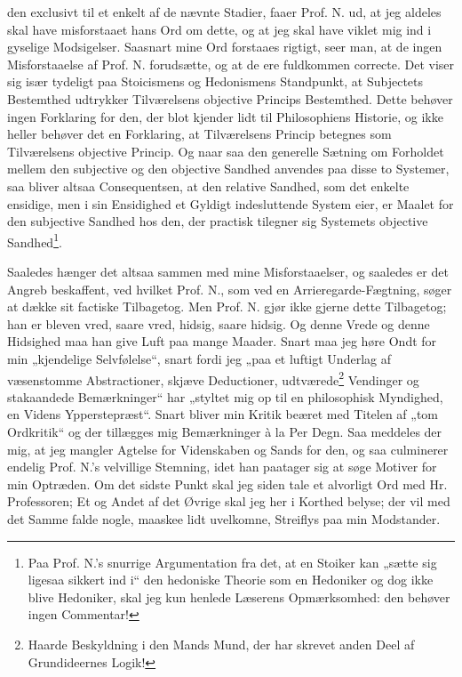 \documentclass[12pt,a4paper]{book}
\newcommand{\opage}[1]{\marginnote{\footnotesize\textit{[#1]}}}
\begin{document}
den exclusivt til et enkelt af de nævnte Stadier, faaer Prof. N. ud, at jeg
aldeles skal have misforstaaet hans Ord om dette, og at jeg skal have viklet mig
ind i gyselige Modsigelser. Saasnart mine Ord forstaaes rigtigt, seer man, at de
ingen Misforstaaelse af Prof. N. forudsætte, og at de ere fuldkommen correcte.
Det viser sig især tydeligt paa Stoicismens og Hedonismens Standpunkt, at
Subjectets Bestemthed udtrykker Tilværelsens objective Princips Bestemthed. Dette
behøver ingen Forklaring for den, der blot kjender lidt til Philosophiens
Historie, og ikke heller behøver det en Forklaring, at Tilværelsens Princip
betegnes som Tilværelsens objective Princip. Og naar saa den generelle Sætning om
Forholdet mellem den subjective og den objective Sandhed anvendes paa disse to
Systemer, saa bliver altsaa Consequentsen, at den relative Sandhed, som det
enkelte ensidige, men i sin Ensidighed et Gyldigt indesluttende System eier, er
Maalet for den subjective Sandhed hos den, der practisk tilegner sig Systemets
objective Sandhed\footnote{%
  Paa Prof. N.'s snurrige Argumentation fra det, at en Stoiker kan „sætte sig
  ligesaa sikkert ind i“ den hedoniske Theorie som en Hedoniker og dog ikke
  blive Hedoniker, skal jeg kun henlede Læserens Opmærksomhed: den behøver ingen
  Commentar!}.

Saaledes hænger det altsaa sammen med mine Misforstaaelser, og saaledes er det
Angreb beskaffent, ved hvilket Prof. N., som ved en Arrieregarde-Fægtning, søger
at dække sit factiske Tilbagetog. Men Prof. N. gjør ikke gjerne dette Tilbagetog;
han er bleven vred, saare vred, hidsig, saare hidsig. Og denne Vrede og denne
Hidsighed maa han give Luft paa
\opage{18} \setcounter{footnote}{0}
mange Maader. Snart maa jeg høre Ondt for min „kjendelige Selvfølelse“, snart
fordi jeg „paa et luftigt Underlag af væsenstomme Abstractioner, skjæve
Deductioner, udtværede\footnote{%
  Haarde Beskyldning i den Mands Mund, der har skrevet anden Deel af
  Grundideernes Logik!} Vendinger og stakaandede Bemærkninger“ har „styltet mig
op til en philosophisk Myndighed, en Videns Ypperstepræst“. Snart bliver min
Kritik beæret med Titelen af „tom Ordkritik“ og der tillægges mig Bemærkninger
à la Per Degn. Saa meddeles der mig, at jeg mangler Agtelse for Videnskaben og
Sands for den, og saa culminerer endelig Prof. N.'s velvillige Stemning, idet han
paatager sig at søge Motiver for min Optræden. Om det sidste Punkt skal jeg siden
tale et alvorligt Ord med Hr. Professoren; Et og Andet af det Øvrige skal jeg her
i Korthed belyse; der vil med det Samme falde nogle, maaskee lidt uvelkomne,
Streiflys paa min Modstander.
\end{document}
